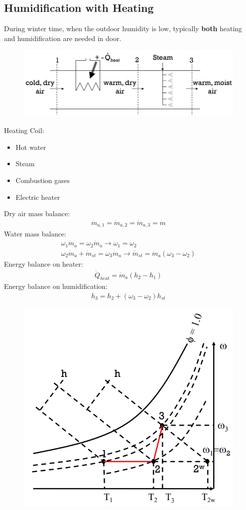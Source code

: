 \documentclass[class=report, crop=false, 12pt,a4paper]{standalone}
\numberwithin{equation}{section}
\begin{document}
\subsection{Humidification with Heating}
During winter time, when the outdoor humidity is low, typically \textbf{both} heating and humidification are needed in door.
\begin{figure}[H]
  \centering
  \includegraphics[width = 0.85 \textwidth]{../img/diagram119.png}
  \caption{}
\end{figure}
Heating Coil:
\begin{itemize}[noitemsep]
  \item Hot water
  \item Steam
  \item Combustion gases
  \item Electric heater
\end{itemize}
Dry air mass balance:
\begin{gather}
  \dot{m}_{a,1} = \dot{m}_{a,2} = \dot{m}_{a,3} = \dot{m}
\end{gather}
Water mass balance:
\begin{gather}
  \omega_1\dot{m}_{a} = \omega_2\dot{m}_{a} \longrightarrow \omega_1 = \omega_2 \\[5pt]
  \omega_2\dot{m}_{a} + \dot{m}_{st} = \omega_3\dot{m}_{a} \longrightarrow \dot{m}_{st} = \dot{m}_{a}(\omega_3-\omega_2)
\end{gather}
Energy balance on heater:
\begin{gather}
  \dot{Q}_{heat} = \dot{m}_{a}(h_2-h_1)
\end{gather}
Energy balance on humidification:
\begin{gather}
  h_3 = h_2 + (\omega_3-\omega_2)h_{st}
\end{gather}
\begin{figure}[H]
  \centering
  \includegraphics[width = 0.6 \textwidth]{../img/diagram120.png}
  \caption{}
\end{figure}
\end{document}
